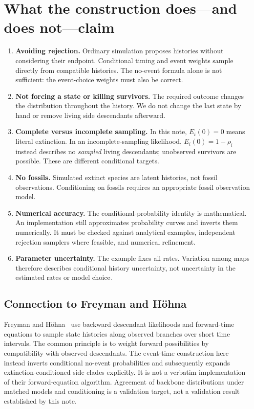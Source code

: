 \documentclass[11pt,a4paper]{article}
\begin{document}
\section{What the construction does---and does not---claim}
\begin{enumerate}
\item \textbf{Avoiding rejection.} Ordinary simulation proposes histories
without considering their endpoint. Conditional timing and event weights
sample directly from compatible histories. The no-event formula alone is
not sufficient: the event-choice weights must also be correct.
\item \textbf{Not forcing a state or killing survivors.} The required outcome
changes the distribution throughout the history. We do not change the last
state by hand or remove living side descendants afterward.
\item \textbf{Complete versus incomplete sampling.} In this note,
\(E_i(0)=0\) means literal extinction. In an incomplete-sampling likelihood,
\(E_i(0)=1-\rho_i\) instead describes no \emph{sampled} living descendants;
unobserved survivors are possible. These are different conditional targets.
\item \textbf{No fossils.} Simulated extinct species are latent histories,
not fossil observations. Conditioning on fossils requires an appropriate
fossil observation model.
\item \textbf{Numerical accuracy.} The conditional-probability identity is
mathematical. An implementation still approximates probability curves and
inverts them numerically. It must be checked against analytical examples,
independent rejection samplers where feasible, and numerical refinement.
\item \textbf{Parameter uncertainty.} The example fixes all rates. Variation
among maps therefore describes conditional history uncertainty, not uncertainty
in the estimated rates or model choice.
\end{enumerate}

\subsection{Connection to Freyman and H\"ohna}
Freyman and H\"ohna~\cite{freyman} use backward descendant likelihoods and
forward-time equations to sample state histories along observed branches over
short time intervals. The common principle is to weight forward possibilities
by compatibility with observed descendants. The event-time construction here
instead inverts conditional no-event probabilities and subsequently expands
extinction-conditioned side clades explicitly. It is not a verbatim
implementation of their forward-equation algorithm. Agreement of backbone
distributions under matched models and conditioning is a validation target,
not a validation result established by this note.
\end{document}
